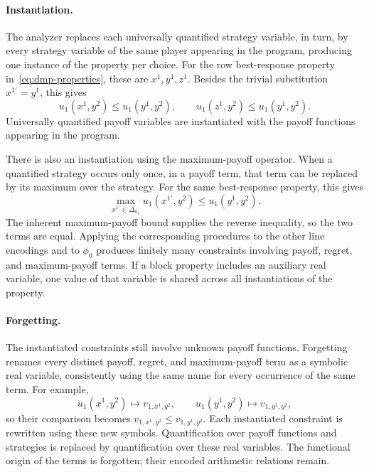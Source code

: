\documentclass[11pt]{article}
\theoremstyle{remark}
\theoremstyle{plain}
\begin{document}
\paragraph{Instantiation.}
The analyzer replaces each universally quantified strategy
variable, in turn, by every strategy variable of the same player
appearing in the program, producing one instance of the property per
choice. For the row best-response property
in~\eqref{eq:dmp-properties}, these are $x^1,y^1,z^1$. Besides the
trivial substitution $x^{1\prime}=y^1$, this gives
\[
 u_1(x^1,y^2)\le u_1(y^1,y^2),\qquad
 u_1(z^1,y^2)\le u_1(y^1,y^2).
\]
Universally quantified payoff variables are instantiated with the
payoff functions appearing in the program.

There is also an instantiation using the maximum-payoff operator.
When a quantified strategy occurs only once, in a payoff term, that
term can be replaced by its maximum over the strategy. For the same
best-response property, this gives
\[
 \max_{x^{1\prime}\in\Delta_{n_1}}u_1(x^{1\prime},y^2)
 \le u_1(y^1,y^2).
\]
The inherent maximum-payoff bound supplies the reverse inequality,
so the two terms are equal. Applying the corresponding procedures
to the other line encodings and to $\phi_0$ produces finitely many
constraints involving payoff, regret, and maximum-payoff terms.
If a block property includes an auxiliary real variable, one value
of that variable is shared across all instantiations of the property.

\paragraph{Forgetting.}
The instantiated constraints still involve unknown payoff functions.
Forgetting renames every distinct payoff, regret, and maximum-payoff
term as a symbolic real variable, consistently using the same name
for every occurrence of the same term. For example,
\[
 u_1(x^1,y^2)\mapsto v_{1,x^1,y^2},\qquad
 u_1(y^1,y^2)\mapsto v_{1,y^1,y^2},
\]
so their comparison becomes
$v_{1,x^1,y^2}\le v_{1,y^1,y^2}$.
Each instantiated constraint is rewritten using these new symbols.
Quantification over payoff functions and strategies is replaced by
quantification over these real variables. The functional origin of
the terms is forgotten; their encoded arithmetic relations remain.
\end{document}
